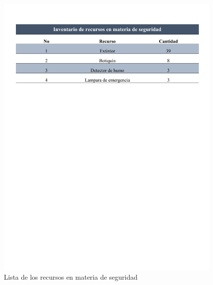     \begin{figure}[H]
      \centering
      \includegraphics[trim = {10mm 180mm 10mm 15mm},clip,scale=0.35]{22/Img/inventarioDeRecursos.pdf}
       \caption{Lista de los recursos en materia de seguridad}
       \label{fig:inventarioRecursos}
     \end{figure}
    
